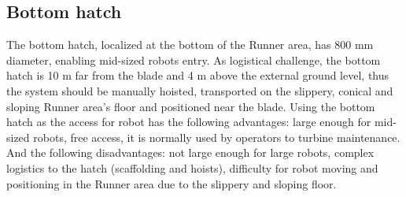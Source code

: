 \subsection{Bottom hatch}
The bottom hatch, localized at the bottom of the Runner area, has 800 mm
diameter, enabling mid-sized robots entry. As logistical challenge, the bottom
hatch is 10 m far from the blade and 4 m above the external ground level,
thus the system should be manually hoisted, transported on the slippery, conical
and sloping Runner area's floor and positioned near the blade. Using the bottom
hatch as the access for robot has the following advantages: large enough for
mid-sized robots, free access, it is normally used by operators to turbine
maintenance. And the following disadvantages: not large enough for large robots,
complex logistics to the hatch (scaffolding and hoists), difficulty for robot
moving and positioning in the Runner area due to the slippery and sloping floor.





